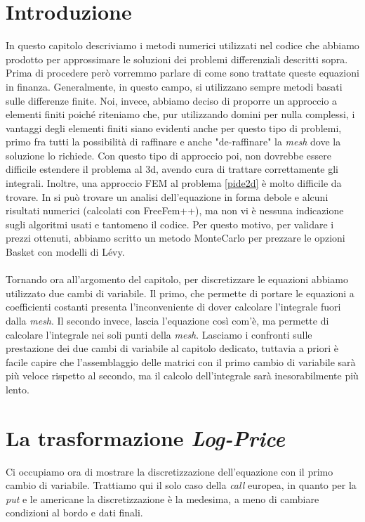 \documentclass[a4paper,10pt]{report}
\theoremstyle{plain}
\theoremstyle{definition}
\theoremstyle{remark}
\begin{document}
\section{Introduzione}
In questo capitolo descriviamo i metodi numerici utilizzati nel codice che abbiamo prodotto per approssimare le soluzioni dei problemi differenziali descritti sopra. Prima di procedere per\`o vorremmo parlare di come sono trattate queste equazioni in finanza. Generalmente, in questo campo, si utilizzano sempre metodi basati sulle differenze finite. Noi, invece, abbiamo deciso di proporre un approccio a elementi finiti poich\'e riteniamo che, pur utilizzando domini per nulla complessi, i vantaggi degli elementi finiti siano evidenti anche per questo tipo di problemi, primo fra tutti la possibilit\`a di raffinare e anche "de-raffinare" la \emph{mesh} dove la soluzione lo richiede. Con questo tipo di approccio poi, non dovrebbe essere difficile estendere il problema al 3d, avendo cura di trattare correttamente gli integrali. Inoltre, una approccio FEM al problema \ref{pide2d} è molto difficile da trovare. In \cite{jinghui2009multi} si può trovare un analisi dell'equazione in forma debole e alcuni risultati numerici (calcolati con \textsf{FreeFem++}), ma non vi è nessuna indicazione sugli algoritmi usati e tantomeno il codice. Per questo motivo, per validare i prezzi ottenuti, abbiamo scritto un metodo MonteCarlo per prezzare le opzioni Basket con modelli di L\'evy.\\\\Tornando ora all'argomento del capitolo, per discretizzare le equazioni abbiamo utilizzato due cambi di variabile. Il primo, che permette di portare le equazioni a coefficienti costanti presenta l'inconveniente di dover calcolare l'integrale fuori dalla \emph{mesh}. Il secondo invece, lascia l'equazione cos\`i com'\`e, ma permette di calcolare l'integrale nei soli punti della \emph{mesh}. Lasciamo i confronti sulle prestazione dei due cambi di variabile al capitolo dedicato, tuttavia a priori \`e facile capire che l'assemblaggio delle matrici con il primo cambio di variabile sar\`a pi\`u veloce rispetto al secondo, ma il calcolo dell'integrale sar\`a inesorabilmente pi\`u lento.

\section{La trasformazione \emph{Log-Price}}
Ci occupiamo ora di mostrare la discretizzazione dell'equazione con il primo cambio di variabile. Trattiamo qui il solo caso della \emph{call} europea, in quanto per la \emph{put} e le americane la discretizzazione \`e la medesima, a meno di cambiare condizioni al bordo e dati finali.
\end{document}
